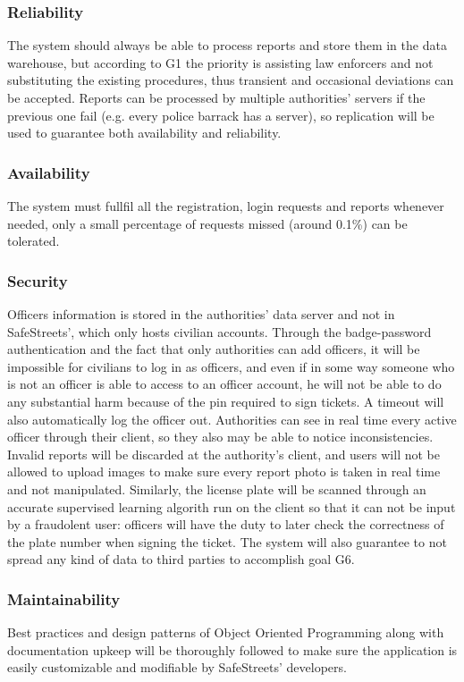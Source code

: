 \documentclass[12pt,a4paper]{article}
\begin{document}
\subsubsection{Reliability}
The system should always be able to process reports and store them in the data warehouse, but according to G1 the priority is assisting law enforcers and not substituting the existing procedures, thus transient and occasional deviations can be accepted. Reports can be processed by multiple authorities' servers if the previous one fail (e.g. every police barrack has a server), so replication will be used to guarantee both availability and reliability.
\subsubsection{Availability}
The system must fullfil all the registration, login requests and reports whenever needed, only a small percentage of requests missed (around 0.1\%) can be tolerated. 
\subsubsection{Security}
Officers information is stored in the authorities' data server and not in SafeStreets', which only hosts civilian accounts. Through the badge-password authentication and the fact that only authorities can add officers, it will be impossible for civilians to log in as officers, and even if in some way someone who is not an officer is able to access to an officer account, he will not be able to do any substantial harm because of the pin required to sign tickets. A timeout will also automatically log the officer out. Authorities can see in real time every active officer through their client, so they also may be able to notice inconsistencies. Invalid reports will be discarded at the authority's client, and users will not be allowed to upload images to make sure every report photo is taken in real time and not manipulated. Similarly, the license plate will be scanned through an accurate supervised learning algorith run on the client so that it can not be input by a fraudolent user: officers will have the duty to later check the correctness of the plate number when signing the ticket.
The system will also guarantee to not spread any kind of data to third parties to accomplish goal G6.
\subsubsection{Maintainability}
Best practices and design patterns of Object Oriented Programming along with documentation upkeep will be thoroughly followed to make sure the application is easily customizable and modifiable by SafeStreets' developers.
\end{document}
